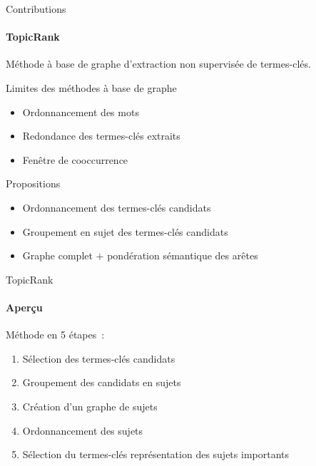 \begin{frame}{Contributions}\framesubtitle{TopicRank}
  Méthode à base de graphe d'extraction non supervisée de termes-clés.

  \vspace{1em}

  \begin{alertblock}{Limites des méthodes à base de graphe}
    \begin{itemize}
      \item{Ordonnancement des mots}
      \item{Redondance des termes-clés extraits}
      \item{Fenêtre de cooccurrence}
    \end{itemize}
  \end{alertblock}

  \vspace{1em}

  \begin{block}{Propositions}
    \begin{itemize}
      \item{Ordonnancement des termes-clés candidats}
      \item{Groupement en sujet des termes-clés candidats}
      \item{Graphe complet $+$ pondération sémantique des arêtes}
    \end{itemize}
  \end{block}
\end{frame}

\begin{frame}{TopicRank}\framesubtitle{Aperçu}
  Méthode en 5 étapes~:
  \begin{enumerate}
    \item{Sélection des termes-clés candidats}
    \item{Groupement des candidats en sujets}
    \item{Création d'un graphe de sujets}
    \item{Ordonnancement des sujets}
    \item{Sélection du termes-clés représentation des sujets importants}
  \end{enumerate}
\end{frame}

